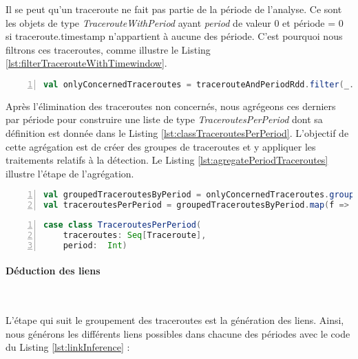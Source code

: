 Il se peut qu'un traceroute ne fait pas partie de la période de l'analyse. Ce sont les objets de type \textit{TracerouteWithPeriod}  ayant  \textit{period} de valeur $0$ et période = 0 si traceroute.timestamp n'appartient à aucune des période. C'est pourquoi nous filtrons ces traceroutes, comme  illustre le Listing  \ref{lst:filterTracerouteWithTimewindow}.

\begin{lstlisting}[language=scala,firstnumber=1, caption={Elimination des traceroutes non concernés par l'analyse },label={lst:filterTracerouteWithTimewindow}, basicstyle = \footnotesize,escapechar=|,numbers=left,
stepnumber=1]
val onlyConcernedTraceroutes = tracerouteAndPeriodRdd.filter(_.period != 0)
\end{lstlisting}

Après l'élimination des traceroutes non concernés, nous agrégeons ces derniers par période pour construire une liste de type   \textit{TraceroutesPerPeriod} dont sa définition est  donnée dans le Listing \ref{lst:classTraceroutesPerPeriod}. 
L'objectif de cette agrégation est de créer des groupes de traceroutes et y  appliquer les traitements relatifs à la détection. 
Le Listing \ref{lst:agregatePeriodTraceroutes} illustre l'étape de l'agrégation.


\begin{lstlisting}[language=scala,firstnumber=1, caption={Le groupement des traceroutes },label={lst:agregatePeriodTraceroutes}, basicstyle = \footnotesize,escapechar=|,numbers=left,
stepnumber=1]
val groupedTraceroutesByPeriod = onlyConcernedTraceroutes.groupBy(_.period)
val traceroutesPerPeriod = groupedTraceroutesByPeriod.map(f => TraceroutesPerPeriod(f._2.map(f => f.traceroute).toSeq, f._1))
\end{lstlisting}


\begin{lstlisting}[language=scala,firstnumber=1, caption={Définition de la classe TraceroutesPerPeriod },label={lst:classTraceroutesPerPeriod}, basicstyle = \footnotesize,escapechar=|,numbers=left,
stepnumber=1]
case class TraceroutesPerPeriod(
	traceroutes: Seq[Traceroute],
	period:  Int)
\end{lstlisting}

\paragraph{Déduction des liens}~

L'étape qui suit le groupement des traceroutes est la génération des liens. Ainsi, nous générons les différents liens possibles dans chacune des périodes avec le code du Listing \ref{lst:linkInference} :

